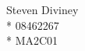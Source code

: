 \documentclass[a4paper,12pt]{article}
\begin{document}
\begin{center}

{\large Steven Diviney}
\\*
08462267
\\*
MA2C01
\end{center}
\end{document}
